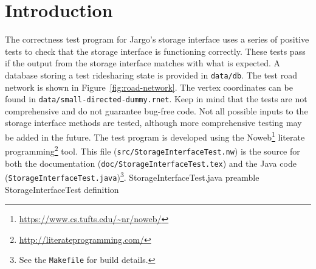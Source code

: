 \documentclass{article}
\def\nwendcode{\endtrivlist \endgroup}
\let\nwdocspar=\par
\theoremstyle{definition}
\begin{document}
\section{Introduction}
\label{sec:introduction}
The correctness test program for Jargo's storage interface uses a series of
positive tests to check that the storage interface is functioning correctly.
These tests pass if the output from the storage interface matches with what is
expected. A database storing a test ridesharing state is provided in
{\tt{}data/db}.  The test road network is shown in Figure~\ref{fig:road-network}.
The vertex coordinates can be found in {\tt{}data/small-directed-dummy.rnet}.
Keep in mind that the tests are not comprehensive and do not guarantee bug-free
code. Not all possible inputs to the storage interface methods are tested,
although more comprehensive testing may be added in the future.
The test program is developed using the
Noweb\footnote{\url{https://www.cs.tufts.edu/~nr/noweb/}} literate
programming\footnote{\url{http://literateprogramming.com/}} tool.  This file
({\tt{}src/StorageInterfaceTest.nw}) is the source for both the documentation
({\tt{}doc/StorageInterfaceTest.tex}) and the Java code ({\tt{}StorageInterfaceTest.java})\footnote{See the
{\tt{}Makefile} for build details.}.
\endmoddef{}
  \LA{}StorageInterfaceTest.java preamble~{\nwtagstyle{}}\RA{}
  \LA{}\code{}StorageInterfaceTest\edoc{} definition~{\nwtagstyle{}}\RA{}
\nwendcode{}\nwdocspar
\end{document}
